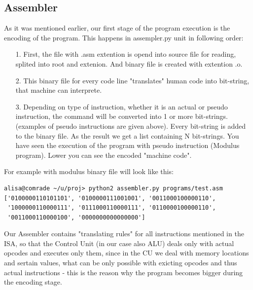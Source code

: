 \documentclass[11pt,a4paper]{article}
\begin{document}
\newpage
\subsection{Assembler}
As it was mentioned earlier, our first stage of the program execution is the encoding of the program. This happens in assempler.py unit in following order:
\begin{enumerate}
	\item[1.] First, the file with .asm extention is opend into source file for reading, splited into root and extenion. And binary file is created with extention .o.
	\item[2.] This binary file for every code line	"translates" human code into bit-string, that machine can interprete.
	\item[3.] Depending on type of instruction, whether it is an actual or pseudo instruction, the command will be converted into 1 or more bit-strings. (examples of pseudo instructions are given above). Every bit-string is added to the binary file. As the result we get a list containing N bit-strings. You have seen the execution of the program with pseudo instruction (Modulus program). Lower you can see the encoded "machine code". 
\end{enumerate}
For example with modulus binary file will look like this:
\begin{verbatim}
alisa@comrade ~/u/proj> python2 assembler.py programs/test.asm
['0100000110101101', '0100000111001001', '0011000100000110',
 '1000000110000111', '0111000110000111', '0110000100000110',
 '0011000110000100', '0000000000000000']
\end{verbatim} 
Our Assembler contains "translating rules" for all instructions mentioned in the ISA, so that the Control Unit (in our case also ALU) deals only with actual opcodes and executes only them, since in the CU we deal with memory locations and sertain values, what can be only possible with exicting opcodes and thus actual instructions - this is the reason why the program becomes bigger during the encoding stage.\\
\end{document}
